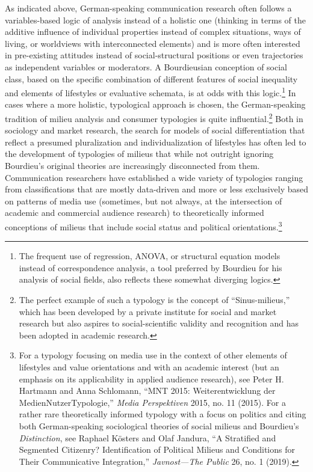 \documentclass{tufte-handout}
\begin{document}
As indicated above, German-speaking communication research often follows
a variables-based logic of analysis instead of a holistic one (thinking
in terms of the additive influence of individual properties instead of
complex situations, ways of living, or worldviews with interconnected
elements) and is more often interested in pre-existing attitudes instead
of social-structural positions or even trajectories as independent
variables or moderators. A Bourdieusian conception of social class,
based on the specific combination of different features of social
inequality and elements of lifestyles or evaluative schemata, is at odds
with this logic.\footnote{The frequent use of regression, ANOVA, or
  structural equation models instead of correspondence analysis, a tool
  preferred by Bourdieu for his analysis of social fields, also reflects
  these somewhat diverging logics.} In cases where a more holistic,
typological approach is chosen, the German-speaking tradition of milieu
analysis and consumer typologies is quite influential.\footnote{The
  perfect example of such a typology is the concept of
  ``Sinus-milieus,'' which has been developed by a private institute for
  social and market research but also aspires to social-scientific
  validity and recognition and has been adopted in academic research.}
Both in sociology and market research, the search for models of social
differentiation that reflect a presumed pluralization and
individualization of lifestyles has often led to the development of
typologies of milieus that while not outright ignoring Bourdieu's
original theories are increasingly disconnected from them. Communication
researchers have established a wide variety of typologies ranging from
classifications that are mostly data-driven and more or less exclusively
based on patterns of media use (sometimes, but not always, at the
intersection of academic and commercial audience research) to
theoretically informed conceptions of milieus that include social status
and political orientations.\footnote{For a typology focusing on media
  use in the context of other elements of lifestyles and value
  orientations and with an academic interest (but an emphasis on its
  applicability in applied audience research), see Peter H. Hartmann and
  Anna Schlomann, ``MNT 2015: Weiterentwicklung der
  MedienNutzerTypologie,'' \emph{Media Perspektiven} 2015, no. 11
  (2015). For a rather rare theoretically informed typology with a focus
  on politics and citing both German-speaking sociological theories of
  social milieus and Bourdieu's \emph{Distinction}, see Raphael Kösters
  and Olaf Jandura, ``A Stratified and Segmented Citizenry?
  Identification of Political Milieus and Conditions for Their
  Communicative Integration,'' \emph{Javnost---The Public} 26, no. 1
  (2019).}
\end{document}

